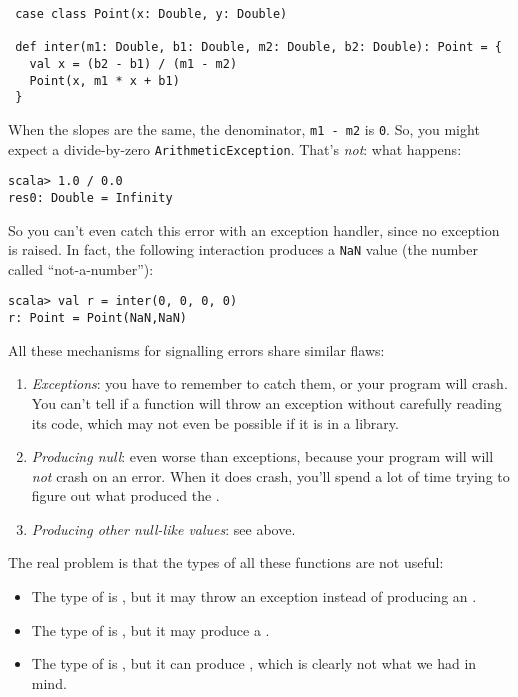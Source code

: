 \documentclass[9pt]{extbook}
\begin{document}
\lstset{language=scala}
\begin{lstlisting}
 case class Point(x: Double, y: Double)

 def inter(m1: Double, b1: Double, m2: Double, b2: Double): Point = {
   val x = (b2 - b1) / (m1 - m2)
   Point(x, m1 * x + b1)
 }
\end{lstlisting}

When the slopes are the same, the denominator, \lstinline|m1 - m2| is
\lstinline|0|. So, you
might expect a divide-by-zero \lstinline|ArithmeticException|.
That's \emph{not}: what happens:
\lstset{language=console}
\begin{lstlisting}
scala> 1.0 / 0.0
res0: Double = Infinity
\end{lstlisting}
\lstset{language=scala}
So you can't even catch this error with an exception handler, since no exception
is raised. In fact, the following interaction produces a \lstinline|NaN| value
(the number called ``not-a-number''):
\lstset{language=console}
\begin{lstlisting}
scala> val r = inter(0, 0, 0, 0)
r: Point = Point(NaN,NaN)
\end{lstlisting}

All these mechanisms for signalling errors share similar flaws:
%
\begin{enumerate}

  \item \emph{Exceptions}: you have to remember to catch them, or your program will
   crash. You can't tell if a function will throw an exception without carefully
   reading its code, which may not even be possible if it is in a library.

  \item  \emph{Producing null}: even worse than exceptions, because your program
   will will \emph{not} crash on an error. When it does crash, you'll spend a
   lot of time trying to figure out what produced the .

   \item \emph{Producing other null-like values}: see above.

 \end{enumerate}

The real problem is that the types of all these functions are not useful:

\begin{itemize}

  \item The type of  is
  , but it may throw an exception instead of producing an .

  \item The type of  is , but it
  may produce a .

  \item The type of  is ,
  but it can produce , which is clearly not what we
  had in mind.

\end{itemize}
\end{document}
